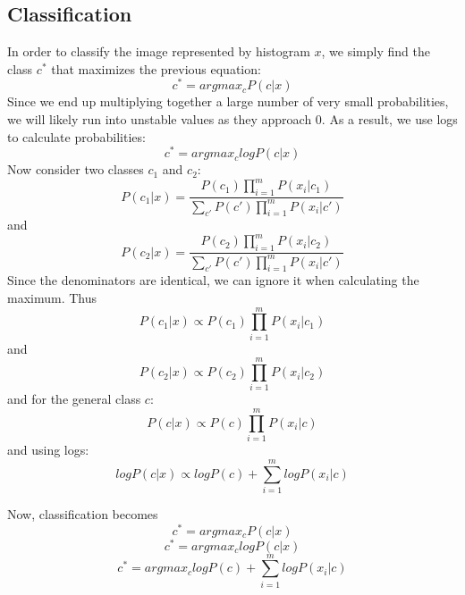 \documentclass{article}
\begin{document}
\subsection{Classification}
In order to classify the image represented by histogram $x$, we simply find the class $c^*$ that maximizes the previous equation:
$$c^*=arg{max}_{c}P(c|x)$$
Since we end up multiplying together a large number of very small probabilities, we will likely run into unstable values as they approach 0. As a result, we use logs to calculate probabilities:
$$c^*=arg{max}_{c}logP(c|x)$$
Now consider two classes $c_1$ and $c_2$:
$$P(c_1|x) = \frac{P(c_1)\prod_{i=1}^mP(x_i|c_1)}{\sum_{c'}P(c')\prod_{i=1}^mP(x_i|c')}$$
and
$$P(c_2|x) = \frac{P(c_2)\prod_{i=1}^mP(x_i|c_2)}{\sum_{c'}P(c')\prod_{i=1}^mP(x_i|c')}$$
Since the denominators are identical, we can ignore it when calculating the maximum. Thus
$$P(c_1|x) \propto P(c_1)\prod_{i=1}^mP(x_i|c_1)$$
and
$$P(c_2|x) \propto P(c_2)\prod_{i=1}^mP(x_i|c_2)$$
and for the general class $c$:
$$P(c|x) \propto P(c)\prod_{i=1}^mP(x_i|c)$$
and using logs:
$$logP(c|x) \propto logP(c)+\sum_{i=1}^mlogP(x_i|c)$$

Now, classification becomes 
$$c^*=arg{max}_{c}P(c|x)$$
$$c^*=arg{max}_{c}logP(c|x)$$
$$c^*=arg{max}_{c}logP(c)+\sum_{i=1}^mlogP(x_i|c)$$

%
%
\end{document}
